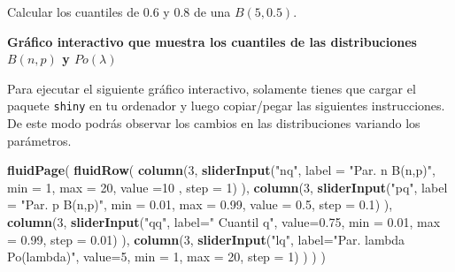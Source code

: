 \documentclass[]{book}
\newenvironment{Shaded}{\begin{snugshade}}{\end{snugshade}}
\newcommand{\DataTypeTok}[1]{\textcolor[rgb]{0.13,0.29,0.53}{#1}}
\newcommand{\DecValTok}[1]{\textcolor[rgb]{0.00,0.00,0.81}{#1}}
\newcommand{\FloatTok}[1]{\textcolor[rgb]{0.00,0.00,0.81}{#1}}
\newcommand{\KeywordTok}[1]{\textcolor[rgb]{0.13,0.29,0.53}{\textbf{#1}}}
\newcommand{\NormalTok}[1]{#1}
\newcommand{\StringTok}[1]{\textcolor[rgb]{0.31,0.60,0.02}{#1}}
\begin{document}
Calcular los cuantiles de \(0.6\) y \(0.8\) de una \(B(5,0.5).\)

\textbf{Gráfico interactivo que muestra los cuantiles de las distribuciones \(B(n,p)\) y \(Po(\lambda)\)}

Para ejecutar el siguiente gráfico interactivo, solamente tienes que cargar el paquete \texttt{shiny} en tu ordenador y luego copiar/pegar las siguientes instrucciones. De este modo podrás observar los cambios en las distribuciones variando los parámetros.

\begin{Shaded}
\begin{Highlighting}[]
\KeywordTok{fluidPage}\NormalTok{(}
\KeywordTok{fluidRow}\NormalTok{(}
  \KeywordTok{column}\NormalTok{(}\DecValTok{3}\NormalTok{,}
         \KeywordTok{sliderInput}\NormalTok{(}\StringTok{"nq"}\NormalTok{, }\DataTypeTok{label =} \StringTok{"Par. n B(n,p)"}\NormalTok{,}
              \DataTypeTok{min =} \DecValTok{1}\NormalTok{, }\DataTypeTok{max =} \DecValTok{20}\NormalTok{, }\DataTypeTok{value =}\DecValTok{10}\NormalTok{ , }\DataTypeTok{step =} \DecValTok{1}\NormalTok{)}
\NormalTok{         ),}
  \KeywordTok{column}\NormalTok{(}\DecValTok{3}\NormalTok{,}
          \KeywordTok{sliderInput}\NormalTok{(}\StringTok{"pq"}\NormalTok{, }\DataTypeTok{label =} \StringTok{"Par. p B(n,p)"}\NormalTok{,}
                     \DataTypeTok{min =} \FloatTok{0.01}\NormalTok{, }\DataTypeTok{max =} \FloatTok{0.99}\NormalTok{, }\DataTypeTok{value =} \FloatTok{0.5}\NormalTok{, }\DataTypeTok{step =} \FloatTok{0.1}\NormalTok{)}
\NormalTok{         ),}
  \KeywordTok{column}\NormalTok{(}\DecValTok{3}\NormalTok{,}
         \KeywordTok{sliderInput}\NormalTok{(}\StringTok{"qq"}\NormalTok{, }\DataTypeTok{label=}\StringTok{" Cuantil q"}\NormalTok{, }\DataTypeTok{value=}\FloatTok{0.75}\NormalTok{, }\DataTypeTok{min =} \FloatTok{0.01}\NormalTok{, }\DataTypeTok{max =} \FloatTok{0.99}\NormalTok{, }
                     \DataTypeTok{step =} \FloatTok{0.01}\NormalTok{)}
\NormalTok{         ),}
  \KeywordTok{column}\NormalTok{(}\DecValTok{3}\NormalTok{,}
         \KeywordTok{sliderInput}\NormalTok{(}\StringTok{"lq"}\NormalTok{, }\DataTypeTok{label=}\StringTok{"Par. lambda Po(lambda)"}\NormalTok{, }\DataTypeTok{value=}\DecValTok{5}\NormalTok{, }\DataTypeTok{min =} \DecValTok{1}\NormalTok{, }\DataTypeTok{max =} \DecValTok{20}\NormalTok{, }
                     \DataTypeTok{step =} \DecValTok{1}\NormalTok{)}
\NormalTok{         )}
\NormalTok{  )}
\NormalTok{)}


\end{Highlighting}
\end{Shaded}
\end{document}
